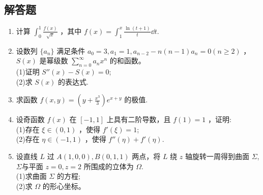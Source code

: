 \subsection{解答题}
\begin{enumerate}
\item 计算 $\displaystyle \int_{0}^{1}\frac{f(x)}{\sqrt{x}}$ ，其中  $\displaystyle f(x)=\int_{1}^{x}\frac{\ln(t+1)}{t}\dd{t}$.
\item 设数列 $\{a_n\}$ 满足条件 $a_0=3,a_1=1,a_{n-2}-n(n-1)a_n=0(n\ge 2)$ ， $S(x)$ 是幂级数 $\displaystyle \sum_{n=0}^\infty a_nx^n$ 的和函数。\\
(1)证明 $S''(x)-S(x)=0$;\\
(2)求 $S(x)$ 的表达式.
\item 求函数 $\displaystyle f(x,y)=(y+\frac{x^3}{3})e^{x+y}$ 的极值.
\item 设奇函数 $f(x)$ 在 $[-1,1]$ 上具有二阶导数，且 $f(1)=1$ ，证明:\\
(1)存在 $\xi \in(0,1)$  ，使得 $f'(\xi)=1$;\\
(2)存在 $\eta \in (-1,1)$ ，使得 $f''(\eta)+f'(\eta)$.
\item 设直线 $L$ 过 $A(1,0,0),B(0,1,1)$ 两点，将 $L$ 绕 $z$ 轴旋转一周得到曲面 $\Sigma$, $\Sigma$与平面 $z=0,z=2$  所围成的立体为 $\Omega$.\\
(1)求曲面 $\Sigma$ 的方程;\\
(2)求 $\Omega$ 的形心坐标。
\end{enumerate}